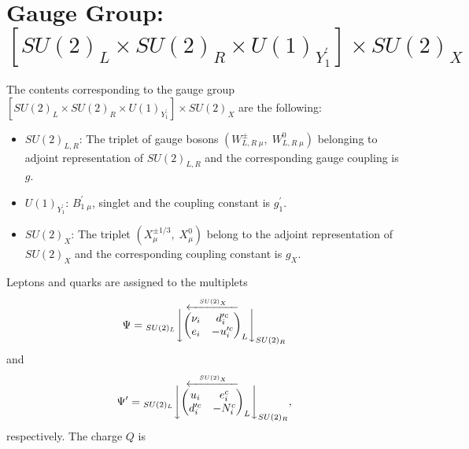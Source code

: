 \documentclass{ws-ijmpa}
\begin{document}
\section{Gauge Group: $\left[SU(2)_{L}\times SU(2)_{R}\times U(1)_{Y_1^{\prime}}\right]\times SU(2)_{X}$}
The contents corresponding to the gauge group $\left[SU(2)_{L}\times SU(2)_{R}\times U(1)_{Y_1^{\prime}}\right]\times SU(2)_{X}$ are the following:
\begin{itemize}
\item $SU(2)_{L,R}$: The triplet of gauge bosons $(W^{\pm}_{L, R\; \mu},\; W^{0}_{L, R\; \mu})$ belonging to adjoint representation of $SU(2)_{L, R}$ and the corresponding gauge coupling is $g$.
\item $U(1)_{Y^{\prime}_1}$: $B^{\prime}_{1\;\mu}$, singlet and the coupling constant is $g^{\prime}_{1}$.
\item $SU(2)_X$: The triplet $(X_{\mu}^{\pm 1/3},\;X_{\mu}^{0})$ belong to the adjoint representation of $SU(2)_X$ and the corresponding coupling constant is $g_X$.
\end{itemize}
Leptons and quarks are assigned to the multiplets
\begin{equation}
\Psi =
{
_{SU(2)_L}{\Bigg\downarrow}{}
\overset{\xleftarrow{~~SU(2)_X~~}}{\begin{pmatrix}
 \nu_i & d^{\prime c}_i \\ 
e_i & -u^{\prime c}_i
\end{pmatrix}}_{L} \Bigg\downarrow_{ SU(2)_R}
}
\label{matrix1-1}
\end{equation}
and
\begin{equation}
\Psi^{\prime} =
{
_{SU(2)_L}{\Bigg\downarrow}{}
\overset{\xleftarrow{~~SU(2)_X~~}}{\begin{pmatrix}
 u_i & e^{c}_i \\ 
d^{\prime c}_i  & -N^{c}_i
\end{pmatrix}}_{L} \Bigg\downarrow_{ SU(2)_R}
}
\label{matrix1-2},
\end{equation}
respectively. The charge $Q$ is
\end{document}

